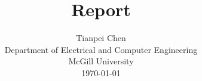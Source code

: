 \documentclass[12pt, draftclsnofoot, onecolumn]{IEEEtran}
\begin{document}
%
\title{Report}

%
%
%
\author{Tianpei Chen\\
Department of Electrical and Computer Engineering\\
McGill University\\
\today}


% 
%
\end{document}
